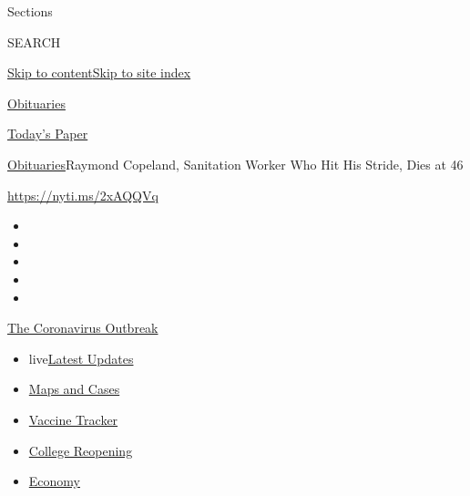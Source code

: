 Sections

SEARCH

\protect\hyperlink{site-content}{Skip to
content}\protect\hyperlink{site-index}{Skip to site index}

\href{https://www.nytimes.com/section/obituaries}{Obituaries}

\href{https://myaccount.nytimes.com/auth/login?response_type=cookie\&client_id=vi}{}

\href{https://www.nytimes.com/section/todayspaper}{Today's Paper}

\href{/section/obituaries}{Obituaries}\textbar{}Raymond Copeland,
Sanitation Worker Who Hit His Stride, Dies at 46

\url{https://nyti.ms/2xAQQVq}

\begin{itemize}
\item
\item
\item
\item
\item
\end{itemize}

\href{https://www.nytimes.com/news-event/coronavirus?action=click\&pgtype=Article\&state=default\&region=TOP_BANNER\&context=storylines_menu}{The
Coronavirus Outbreak}

\begin{itemize}
\tightlist
\item
  live\href{https://www.nytimes.com/2020/08/03/world/coronavirus-covid-19.html?action=click\&pgtype=Article\&state=default\&region=TOP_BANNER\&context=storylines_menu}{Latest
  Updates}
\item
  \href{https://www.nytimes.com/interactive/2020/us/coronavirus-us-cases.html?action=click\&pgtype=Article\&state=default\&region=TOP_BANNER\&context=storylines_menu}{Maps
  and Cases}
\item
  \href{https://www.nytimes.com/interactive/2020/science/coronavirus-vaccine-tracker.html?action=click\&pgtype=Article\&state=default\&region=TOP_BANNER\&context=storylines_menu}{Vaccine
  Tracker}
\item
  \href{https://www.nytimes.com/2020/08/02/us/covid-college-reopening.html?action=click\&pgtype=Article\&state=default\&region=TOP_BANNER\&context=storylines_menu}{College
  Reopening}
\item
  \href{https://www.nytimes.com/live/2020/08/03/business/stock-market-today-coronavirus?action=click\&pgtype=Article\&state=default\&region=TOP_BANNER\&context=storylines_menu}{Economy}
\end{itemize}

